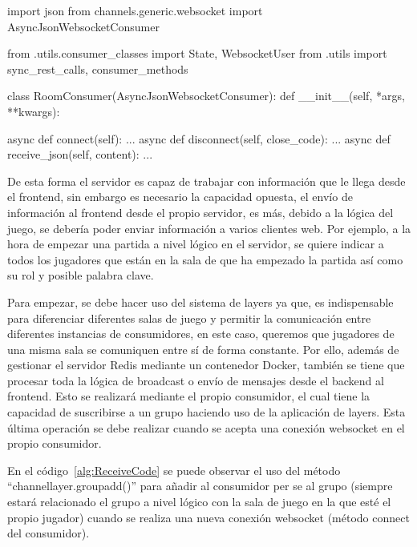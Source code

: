 \begin{mypython}[float={h},caption={RoomConsumer},label={alg:RoomConsumer}]
	import json
	from channels.generic.websocket import AsyncJsonWebsocketConsumer
																																																	
	from .utils.consumer_classes import State, WebsocketUser
	from .utils import sync_rest_calls, consumer_methods
	
	class RoomConsumer(AsyncJsonWebsocketConsumer):
	def __init__(self, *args, **kwargs):
																																																	
	async def connect(self): ...																																			
	async def disconnect(self, close_code):	...																																			
	async def receive_json(self, content): ...	
\end{mypython}

De esta forma el servidor es capaz de trabajar con información que le llega desde el frontend, sin embargo es necesario la capacidad opuesta, el envío de información al 
frontend desde el propio servidor, es más, debido a la lógica del juego, se debería poder enviar información a varios clientes web. Por ejemplo, a la hora de empezar una partida
a nivel lógico en el servidor, se quiere indicar a todos los jugadores que están en la sala de que ha empezado la partida así como su rol y posible palabra clave.

Para empezar, se debe hacer uso del sistema de layers ya que, es indispensable para diferenciar diferentes salas de juego y permitir 
la comunicación entre diferentes instancias de consumidores, en este caso, queremos que jugadores de una misma sala se comuniquen entre sí de forma constante. 
Por ello, además de gestionar el servidor Redis mediante un contenedor Docker, también se tiene que procesar toda la lógica de broadcast
o envío de mensajes desde el backend al frontend. Esto se realizará mediante el propio consumidor, el cual tiene la capacidad de suscribirse a un grupo haciendo uso
de la aplicación de layers. Esta última operación se debe realizar cuando se acepta una conexión websocket en el propio consumidor. 

En el código~\ref{alg:ReceiveCode} se puede observar el uso del método ``channel\textunderscore layer.group\textunderscore add()'' para añadir al consumidor per se 
al grupo (siempre estará relacionado el grupo a nivel lógico con la sala de juego en la que esté el propio jugador) cuando se realiza una nueva conexión websocket (método connect del consumidor). 

